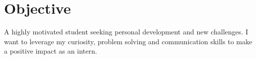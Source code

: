 \section{Objective}
A highly motivated student seeking personal development and new challenges. I want to leverage my curiosity, problem solving and communication skills to make a positive impact as an intern.

\vspace{1em}